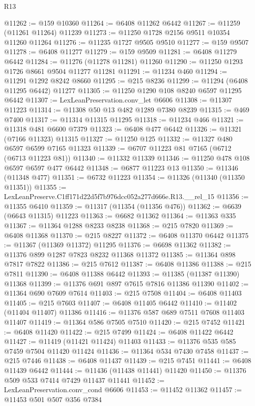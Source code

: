 \begin{lexlean}{R13}
\begin{coremodule}
@11262 := @159 @10360
@11264 := @6408 @11262 @6442
@11267 := @11259 (@11261 @11264) @11239
@11273 := @11250 @1728 @2156 @9511 @10354 @11260 @11264
@11276 := @11235 @1727 @9505 @9510
@11277 := @159 @9507
@11278 := @6408 @11277
@11279 := @159 @9509
@11281 := @6408 @11279 @6442
@11284 := @11276 (@11278 @11281) @11260
@11290 := @11250 @1293 @1726 @8661 @9504 @11277 @11281
@11291 := @11234 @460
@11294 := @11291 @1292 @8242 @8660
@11295 := @215 @8236
@11299 := @11294 (@6408 @11295 @6442) @11277
@11305 := @11250 @1290 @108 @8240 @6597 @11295 @6442
@11307 := LexLeanPreservation.conv_let @6606
@11308 := @11307 @11223
@11314 := @11308 @50 @13 @482 @1289 @7380 @8239
@11315 := @469 @7400
@11317 := @11314 @11315 @11295
@11318 := @11234 @466
@11321 := @11318 @481 @6600 @7379
@11323 := @6408 @477 @6442
@11326 := @11321 (@7166 @11323) @11315
@11327 := @11250 @125
@11332 := @11327 @480 @6597 @6599 @7165 @11323
@11339 := @6707 @11223 @81 @7165 (@6712 (@6713 @11223 @81))
@11340 := @11332 @11339
@11346 := @11250 @478 @108 @6597 @6597 @477 @6442
@11348 := @6877 @11223 @13
@11350 := @11346 (@11348 @477)
@11351 := @6732 @11223
@11354 := @11326 (@11340 (@11350 @11351))
@11355 := LexLeanPreserve.C1ff171d22d5f7b976dcc052a277d666e.R13.__rel_15
@11356 := @11355 @6410
@11359 := @11317 (@11354 (@11356 @476))
@11362 := @6639 (@6643 @11315) @11223
@11363 := @6682 @11362
@11364 := @11363 @335
@11367 := @11364 @1288 @8233 @8238
@11368 := @215 @7820
@11369 := @6408 @11368
@11370 := @215 @8227
@11372 := @6408 @11370 @6442
@11375 := @11367 (@11369 @11372) @11295
@11376 := @6698 @11362
@11382 := @11376 @899 @1287 @7823 @8232 @11368 @11372
@11385 := @11364 @898 @7817 @7822
@11386 := @215 @7612
@11387 := @6408 @11386
@11388 := @215 @7811
@11390 := @6408 @11388 @6442
@11393 := @11385 (@11387 @11390) @11368
@11399 := @11376 @691 @897 @7615 @7816 @11386 @11390
@11402 := @11364 @690 @7609 @7614
@11403 := @215 @7508
@11404 := @6408 @11403
@11405 := @215 @7603
@11407 := @6408 @11405 @6442
@11410 := @11402 (@11404 @11407) @11386
@11416 := @11376 @587 @689 @7511 @7608 @11403 @11407
@11419 := @11364 @586 @7505 @7510
@11420 := @215 @7452
@11421 := @6408 @11420
@11422 := @215 @7499
@11424 := @6408 @11422 @6442
@11427 := @11419 (@11421 @11424) @11403
@11433 := @11376 @535 @585 @7459 @7504 @11420 @11424
@11436 := @11364 @534 @7430 @7458
@11437 := @215 @7446
@11438 := @6408 @11437
@11439 := @215 @7451
@11441 := @6408 @11439 @6442
@11444 := @11436 (@11438 @11441) @11420
@11450 := @11376 @509 @533 @7414 @7429 @11437 @11441
@11452 := LexLeanPreservation.conv_cond @6606
@11453 := @11452 @11362
@11457 := @11453 @501 @507 @356 @7384

\end{coremodule}
\end{lexlean}
